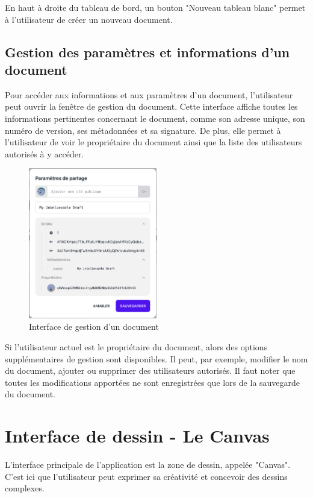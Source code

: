 En haut à droite du tableau de bord, un bouton "Nouveau tableau blanc" permet à l'utilisateur de créer un nouveau document.

\subsection{Gestion des paramètres et informations d'un document}

Pour accéder aux informations et aux paramètres d'un document, l'utilisateur peut ouvrir la fenêtre de gestion du document. Cette interface affiche toutes les informations pertinentes concernant le document, comme son adresse unique, son numéro de version, ses métadonnées et sa signature. De plus, elle permet à l'utilisateur de voir le propriétaire du document ainsi que la liste des utilisateurs autorisés à y accéder.

\begin{figure}[H]
    \centering
    \includegraphics[width=0.5\textwidth]{assets/figures/describble-share-modal.png}
    \caption{Interface de gestion d'un document}
    \label{fig:doc_management}
\end{figure}

Si l'utilisateur actuel est le propriétaire du document, alors des options supplémentaires de gestion sont disponibles. Il peut, par exemple, modifier le nom du document, ajouter ou supprimer des utilisateurs autorisés. Il faut noter que toutes les modifications apportées ne sont enregistrées que lors de la sauvegarde du document.

\section{Interface de dessin - Le Canvas}

L'interface principale de l'application est la zone de dessin, appelée "Canvas". C'est ici que l'utilisateur peut exprimer sa créativité et concevoir des dessins complexes.

